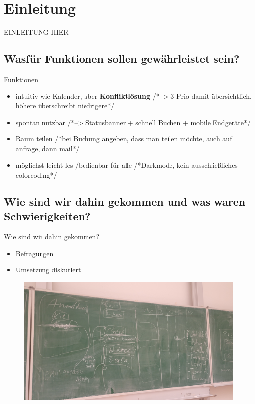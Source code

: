 \section{Einleitung}

\begin{frame}{}{}
    EINLEITUNG HIER
\end{frame}

\subsection[nötige Funktionen]{Wasfür Funktionen sollen gewährleistet sein?}

\begin{frame}{Funktionen}
    \begin{itemize}
        \item intuitiv wie Kalender, aber \textrightarrow \space \textbf{Konfliktlösung} /*--> 3 Prio damit übersichtlich, höhere überschreibt niedrigere*/
        \item spontan nutzbar /*--> Statusbanner + schnell Buchen + mobile Endgeräte*/
        \item Raum teilen /*bei Buchung angeben, dass man teilen möchte, auch auf anfrage, dann mail*/
        \item  möglichst leicht les-/bedienbar für alle /*Darkmode, kein ausschließliches colorcoding*/
    \end{itemize}
\end{frame}

\subsection[Werdegang und Schwierigkeiten]{Wie sind wir dahin gekommen und was waren Schwierigkeiten?}

\begin{frame}{Wie sind wir dahin gekommen?}
    \begin{itemize}
        \item Befragungen
        \item Umsetzung diskutiert
    \end{itemize}
\end{frame}

\begin{frame}
    \begin{figure}
        \centering
        \includegraphics[width=0.6\linewidth]{pictures/BrainstormTafelbild}
        \label{fig: Tafelbild Brainstorm}
    \end{figure}
\end{frame}


